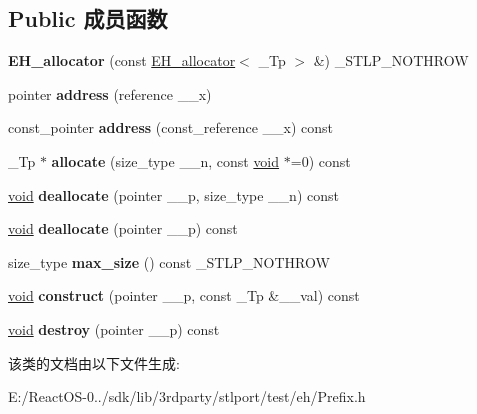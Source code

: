 \subsection*{Public 成员函数}
\begin{DoxyCompactItemize}
\item 
\mbox{\label{class_e_h__allocator_a3bd38d81cd6cc9199bc6880ca9a5fde2}} 
{\bfseries E\+H\+\_\+allocator} (const \hyperlink{class_e_h__allocator}{E\+H\+\_\+allocator}$<$ \+\_\+\+Tp $>$ \&) \+\_\+\+S\+T\+L\+P\+\_\+\+N\+O\+T\+H\+R\+OW
\item 
\mbox{\label{class_e_h__allocator_a27b9137bcf5ff08b0276762975675117}} 
pointer {\bfseries address} (reference \+\_\+\+\_\+x)
\item 
\mbox{\label{class_e_h__allocator_aa64fa65fbe00a96c0d728c3e1d933623}} 
const\+\_\+pointer {\bfseries address} (const\+\_\+reference \+\_\+\+\_\+x) const
\item 
\mbox{\label{class_e_h__allocator_a097e87703086462c74fb7d02876fcc20}} 
\+\_\+\+Tp $\ast$ {\bfseries allocate} (size\+\_\+type \+\_\+\+\_\+n, const \hyperlink{interfacevoid}{void} $\ast$=0) const
\item 
\mbox{\label{class_e_h__allocator_addbb8e85266c5eec905fa3c76d665212}} 
\hyperlink{interfacevoid}{void} {\bfseries deallocate} (pointer \+\_\+\+\_\+p, size\+\_\+type \+\_\+\+\_\+n) const
\item 
\mbox{\label{class_e_h__allocator_a662a03e70524a5c7912ed1150a0f249c}} 
\hyperlink{interfacevoid}{void} {\bfseries deallocate} (pointer \+\_\+\+\_\+p) const
\item 
\mbox{\label{class_e_h__allocator_a0b55f0e9b49a9cb72e9a8dfce2dc6e5d}} 
size\+\_\+type {\bfseries max\+\_\+size} () const \+\_\+\+S\+T\+L\+P\+\_\+\+N\+O\+T\+H\+R\+OW
\item 
\mbox{\label{class_e_h__allocator_a9849b8691aa5a3bf04fb01f20d8c3cbc}} 
\hyperlink{interfacevoid}{void} {\bfseries construct} (pointer \+\_\+\+\_\+p, const \+\_\+\+Tp \&\+\_\+\+\_\+val) const
\item 
\mbox{\label{class_e_h__allocator_a8d6198ab91dc4bbfdbcf8a2f4c03fbf6}} 
\hyperlink{interfacevoid}{void} {\bfseries destroy} (pointer \+\_\+\+\_\+p) const
\end{DoxyCompactItemize}


该类的文档由以下文件生成\+:\begin{DoxyCompactItemize}
\item 
E\+:/\+React\+O\+S-\/0../sdk/lib/3rdparty/stlport/test/eh/Prefix.\+h\end{DoxyCompactItemize}
